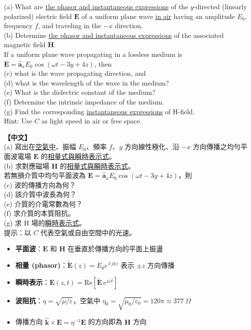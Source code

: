 \documentclass[12pt,a4paper]{article}
\newcommand{\vE}{\mathbf{E}}
\newcommand{\vH}{\mathbf{H}}
\newcommand{\vk}{\mathbf{k}}
\newcommand{\ax}{\hat{\mathbf{a}}_x}
\begin{document}
\begin{questionbox}
(a) What are \underline{the phasor and instantaneous expressions} of the $y$-directed (linearly polarized) electric field $\vE$ of a uniform plane wave \underline{in air} having an amplitude $E_0$, frequency $f$, and traveling in the $-x$ direction.\\
(b) Determine \underline{the phasor and instantaneous expressions} of the associated magnetic field $\vH$.\\[6pt]
If a uniform plane wave propagating in a lossless medium is $\vE = \ax E_0\cos(\omega t - 3y + 4z)$, then\\
(c) what is the wave propagating direction, and\\
(d) what is the wavelength of the wave in the medium?\\
(e) What is the dielectric constant of the medium?\\
(f) Determine the intrinsic impedance of the medium.\\
(g) Find the corresponding \underline{instantaneous expressions} of H-field.\\
Hint: Use $C$ as light speed in air or free space.

\medskip\noindent\textbf{【中文】}\\
(a) 寫出在\underline{空氣中}、振幅 $E_0$、頻率 $f$、$y$ 方向線性極化、沿 $-x$ 方向傳播之均勻平面波電場 $\vE$ 的\underline{相量式與瞬時表示式}。\\
(b) 求對應磁場 $\vH$ 的\underline{相量式與瞬時表示式}。\\[4pt]
若無損介質中均勻平面波為 $\vE = \ax E_0\cos(\omega t - 3y + 4z)$，則\\
(c) 波的傳播方向為何？\\
(d) 該介質中波長為何？\\
(e) 介質的介電常數為何？\\
(f) 求介質的本質阻抗。\\
(g) 求 H 場的\underline{瞬時表示式}。\\
提示：以 $C$ 代表空氣或自由空間中的光速。
\end{questionbox}

\begin{conceptbox}[核心概念]
\begin{itemize}
  \item \textbf{平面波}：$\vE$ 和 $\vH$ 在垂直於傳播方向的平面上振盪
  \item \textbf{相量 (phasor)}：$\tilde{\vE}(z) = E_0 e^{\mp jkz}$ 表示 $\pm z$ 方向傳播
  \item \textbf{瞬時表示}：$\vE(z,t) = \text{Re}[\tilde{\vE}\,e^{j\omega t}]$
  \item \textbf{波阻抗}：$\eta = \sqrt{\mu/\varepsilon}$，空氣中 $\eta_0 = \sqrt{\mu_0/\varepsilon_0} = 120\pi \approx 377\;\Omega$
  \item 傳播方向 $\hat{\vk} \times \vE = \eta^{-1}\vE$ 的方向即為 $\vH$ 方向
\end{itemize}
\end{conceptbox}
\end{document}
